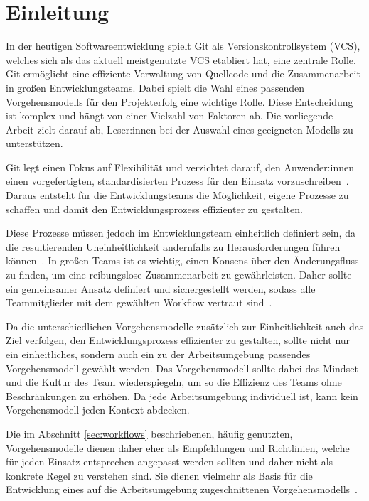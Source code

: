 
\setcounter{page}{1}

\section{Einleitung}
\label{sec:einleitung:motivation}

In der heutigen Softwareentwicklung spielt Git als Versionskontrollsystem (VCS), welches sich als das aktuell meistgenutzte VCS etabliert hat, eine zentrale Rolle. Git ermöglicht eine effiziente Verwaltung von Quellcode und die Zusammenarbeit in großen Entwicklungsteams. Dabei spielt die Wahl eines passenden Vorgehensmodells für den Projekterfolg eine wichtige Rolle. Diese Entscheidung ist komplex und hängt von einer Vielzahl von Faktoren ab. Die vorliegende Arbeit zielt darauf ab, Leser:innen bei der Auswahl eines geeigneten Modells zu unterstützen.

Git legt einen Fokus auf Flexibilität und verzichtet darauf, den Anwender:innen einen vorgefertigten, standardisierten Prozess für den Einsatz vorzuschreiben~\cite{atlassianComparingGitWorkflows2023}. Daraus entsteht für die Entwicklungsteams die Möglichkeit, eigene Prozesse zu schaffen und damit den Entwicklungsprozess effizienter zu gestalten. 

Diese Prozesse müssen jedoch im Entwicklungsteam einheitlich definiert sein, da die resultierenden Uneinheitlichkeit andernfalls zu Herausforderungen führen können~\cite{gitlabg.v.WhatGitWorkflow2023}. In großen Teams ist es wichtig, einen Konsens über den Änderungsfluss zu finden, um eine reibungslose Zusammenarbeit zu gewährleisten. Daher sollte ein gemeinsamer Ansatz definiert und sichergestellt werden, sodass alle Teammitglieder mit dem gewählten Workflow vertraut sind~\cite{atlassianComparingGitWorkflows2023}.

Da die unterschiedlichen Vorgehensmodelle zusätzlich zur Einheitlichkeit auch das Ziel verfolgen, den Entwicklungsprozess effizienter zu gestalten, sollte nicht nur ein einheitliches, sondern auch ein zu der Arbeitsumgebung passendes Vorgehensmodell gewählt werden. 
Das Vorgehensmodell sollte dabei das Mindset und die Kultur des Team wiederspiegeln, um so die Effizienz des Teams ohne Beschränkungen zu erhöhen. Da jede Arbeitsumgebung individuell ist, kann kein Vorgehensmodell jeden Kontext abdecken.

Die im Abschnitt \autoref{sec:workflows} beschriebenen, häufig genutzten, Vorgehensmodelle dienen daher eher als Empfehlungen und Richtlinien, welche für jeden Einsatz entsprechen angepasst werden sollten und daher nicht als konkrete Regel zu verstehen sind. Sie dienen vielmehr als Basis für die Entwicklung eines auf die Arbeitsumgebung zugeschnittenen Vorgehensmodells~\cite{atlassianComparingGitWorkflows2023}.

